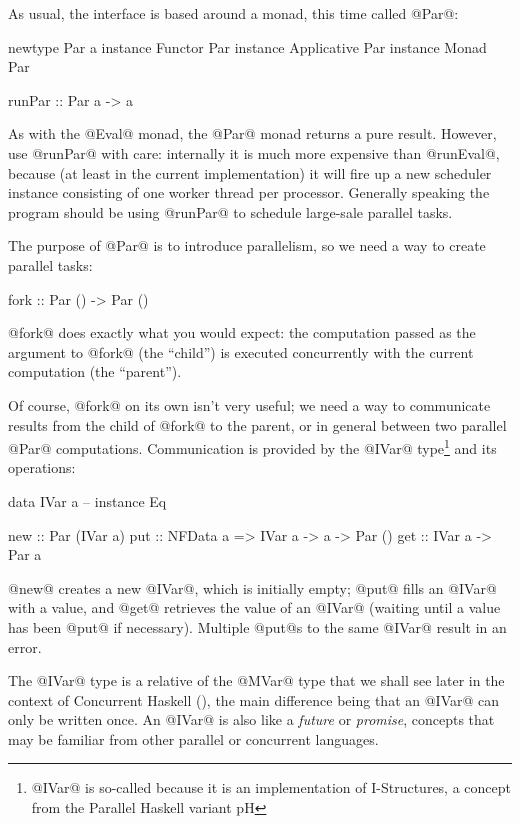 As usual, the interface is based around a monad, this time called @Par@:

\begin{haskell}
  newtype Par a
  instance Functor Par
  instance Applicative Par
  instance Monad Par

  runPar :: Par a -> a
\end{haskell}

\noindent As with the @Eval@ monad, the @Par@ monad returns a pure
result.  However, use @runPar@ with care: internally it is much more
expensive than @runEval@, because (at least in the current
implementation) it will fire up a new scheduler instance consisting of
one worker thread per processor.  Generally speaking the program
should be using @runPar@ to schedule large-sale parallel tasks.

The purpose of @Par@ is to introduce parallelism, so we need a way to
create parallel tasks:

\begin{haskell}
  fork :: Par () -> Par ()
\end{haskell}

\noindent @fork@ does exactly what you would expect: the computation
passed as the argument to @fork@ (the ``child'') is executed
concurrently with the current computation (the ``parent'').

Of course, @fork@ on its own isn't very useful; we need a way to
communicate results from the child of @fork@ to the parent, or in
general between two parallel @Par@ computations.  Communication is
provided by the @IVar@ type\footnote{@IVar@ is so-called because it is an implementation of
I-Structures, a concept from the Parallel Haskell variant pH} and its operations:

\begin{haskell}
  data IVar a  -- instance Eq

  new :: Par (IVar a)
  put :: NFData a => IVar a -> a -> Par ()
  get :: IVar a -> Par a
\end{haskell}

\noindent @new@ creates a new @IVar@, which is initially empty; @put@
fills an @IVar@ with a value, and @get@ retrieves the value of an
@IVar@ (waiting until a value has been @put@ if necessary).  Multiple
@put@s to the same @IVar@ result in an error.

The @IVar@ type is a relative of the @MVar@ type that we shall see
later in the context of Concurrent Haskell (), the main
difference being that an @IVar@ can only be written once.  An @IVar@
is also like a \emph{future} or \emph{promise}, concepts that may be
familiar from other parallel or concurrent languages.


